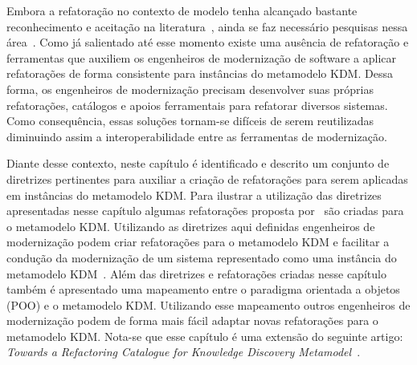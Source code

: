 Embora a refatoração no contexto de modelo tenha alcançado bastante reconhecimento e aceitação na literatura~\cite{Moghadam_2012, Maneerat_2011, Fourati_2011, Einarsson_2012, Steimann_2015, Akiyama_2011, Jensen_2010, Arendt_2012, Millan_2009, Tom_2008_2008}, ainda se faz necessário pesquisas nessa área~\cite{durelli_systematic_mapping, revisao_sistematica_uml_refactoring}. Como já salientado até esse momento existe uma ausência de refatoração e ferramentas que auxiliem os engenheiros de modernização de software a aplicar refatorações de forma consistente para instâncias do metamodelo KDM. Dessa forma, os engenheiros de modernização precisam desenvolver suas próprias refatorações, catálogos e apoios ferramentais para refatorar diversos sistemas. Como consequência, essas soluções tornam-se difíceis de serem reutilizadas diminuindo assim a interoperabilidade entre as ferramentas de modernização. 

Diante desse contexto, neste capítulo é identificado e descrito um conjunto de diretrizes pertinentes para auxiliar a criação de refatorações para serem aplicadas em instâncias do metamodelo KDM. Para ilustrar a utilização das diretrizes apresentadas nesse capítulo algumas refatorações proposta por~ são criadas para o metamodelo KDM. Utilizando as diretrizes aqui definidas engenheiros de modernização podem criar refatorações para o metamodelo KDM e facilitar a condução da modernização de um sistema representado como uma instância do metamodelo KDM~\cite{durelli_catalogo, durelli_VEM_ferramenta}. Além das diretrizes e refatorações criadas nesse capítulo também é apresentado uma mapeamento entre o paradigma orientada a objetos (POO) e o metamodelo KDM. Utilizando esse mapeamento outros engenheiros de modernização podem de forma mais fácil adaptar novas refatorações para o metamodelo KDM. Nota-se que esse capítulo é uma extensão do seguinte artigo: \textit{Towards a Refactoring Catalogue for Knowledge Discovery Metamodel}~\cite{durelli_catalogo}.




